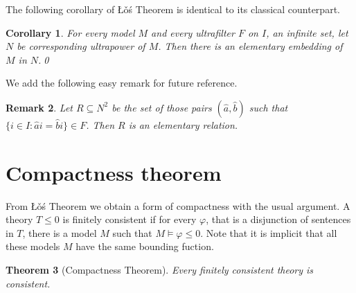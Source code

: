 \documentclass[12pt,letterpaper,oneside,reqno]{amsart}
\theoremstyle{plain}
\newtheorem{theorem}{Theorem}%
\newtheorem{corollary}[theorem]{Corollary}
\newtheorem{remark}[theorem]{Remark}
\theoremstyle{remark}
\begin{document}
The following corollary of  \L\v{o}\'s Theorem is identical to its classical counterpart.

\begin{corollary}
  For every model $M$ and every ultrafilter $F$ on $I$, an infinite set, let $N$ be corresponding ultrapower of $M$.
  Then there is an elementary embedding of $M$ in $N$.\qed
\end{corollary}

We add the following easy remark for future reference.

\begin{remark}
  Let $R\subseteq N^2$ be the set of those pairs $(\hat a, \hat b)$ such that $\{i\in I:\hat ai=\hat bi\}\in F$.
  Then $R$ is an elementary relation.
\end{remark}

\section{Compactness theorem}\label{compactness}

\def\ceq#1#2#3{\parbox[t]{20ex}{$\displaystyle #1$}\parbox{5ex}{\hfil $#2$}{$\displaystyle #3$}}

From \L\v{o}\'s Theorem we obtain a form of compactness with the usual argument. A theory $T\le0$ is finitely consistent if for every $\varphi$, that is a disjunction of sentences in $T$, there is a model $M$ such that $M\models \varphi\le0$.
Note that it is implicit that all these models $M$ have the same bounding fuction.

\begin{theorem}[Compactness Theorem]\label{thm_compattezza}
  Every finitely consistent theory is consistent.
\end{theorem}
\end{document}
